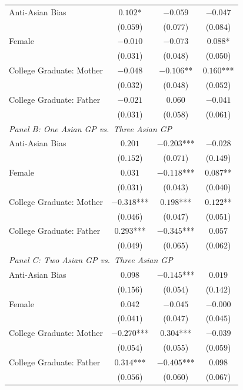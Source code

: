 \documentclass[12pt,english]{article}
\begin{document}
\begin{ThreePartTable}
\begin{longtable}{lccc}
\addlinespace
Anti-Asian Bias & $0.102$* & $-0.059$ & $-0.047$\\
 & ($0.059$) & ($0.077$) & ($0.084$)\\
\addlinespace
Female & $-0.010$ & $-0.073$ & $0.088$*\\
 & ($0.031$) & ($0.048$) & ($0.050$)\\
\addlinespace
College Graduate: Mother & $-0.048$ & $-0.106$** & $0.160$***\\
 & ($0.032$) & ($0.048$) & ($0.052$)\\
\addlinespace
College Graduate: Father & $-0.021$ & $0.060$ & $-0.041$\\
 & ($0.031$) & ($0.058$) & ($0.061$)\\
\midrule
\multicolumn{4}{l}{\textit{Panel B: One Asian GP vs.\ Three Asian GP}} \\
\addlinespace
Anti-Asian Bias & $0.201$ & $-0.203$*** & $-0.028$\\
 & ($0.152$) & ($0.071$) & ($0.149$)\\
\addlinespace
Female & $0.031$ & $-0.118$*** & $0.087$**\\
 & ($0.031$) & ($0.043$) & ($0.040$)\\
\addlinespace
College Graduate: Mother & $-0.318$*** & $0.198$*** & $0.122$**\\
 & ($0.046$) & ($0.047$) & ($0.051$)\\
\addlinespace
College Graduate: Father & $0.293$*** & $-0.345$*** & $0.057$\\
 & ($0.049$) & ($0.065$) & ($0.062$)\\
\midrule
\multicolumn{4}{l}{\textit{Panel C: Two Asian GP vs.\ Three Asian GP}} \\
\addlinespace
Anti-Asian Bias & $0.098$ & $-0.145$*** & $0.019$\\
 & ($0.156$) & ($0.054$) & ($0.142$)\\
\addlinespace
Female & $0.042$ & $-0.045$ & $-0.000$\\
 & ($0.041$) & ($0.047$) & ($0.045$)\\
\addlinespace
College Graduate: Mother & $-0.270$*** & $0.304$*** & $-0.039$\\
 & ($0.054$) & ($0.055$) & ($0.059$)\\
\addlinespace
College Graduate: Father & $0.314$*** & $-0.405$*** & $0.098$\\
 & ($0.056$) & ($0.060$) & ($0.067$)\\
\end{longtable}
\end{ThreePartTable}
\endgroup
\end{document}
